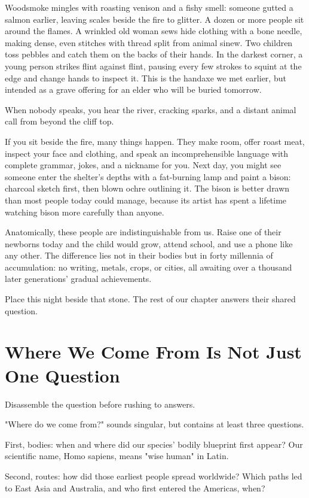 Woodsmoke mingles with roasting venison and a fishy smell: someone gutted a salmon earlier, leaving scales beside the fire to glitter. A dozen or more people sit around the flames. A wrinkled old woman sews hide clothing with a bone needle, making dense, even stitches with thread split from animal sinew. Two children toss pebbles and catch them on the backs of their hands. In the darkest corner, a young person strikes flint against flint, pausing every few strokes to squint at the edge and change hands to inspect it. This is the handaxe we met earlier, but intended as a grave offering for an elder who will be buried tomorrow.

When nobody speaks, you hear the river, cracking sparks, and a distant animal call from beyond the cliff top.

If you sit beside the fire, many things happen. They make room, offer roast meat, inspect your face and clothing, and speak an incomprehensible language with complete grammar, jokes, and a nickname for you. Next day, you might see someone enter the shelter's depths with a fat-burning lamp and paint a bison: charcoal sketch first, then blown ochre outlining it. The bison is better drawn than most people today could manage, because its artist has spent a lifetime watching bison more carefully than anyone.

Anatomically, these people are indistinguishable from us. Raise one of their newborns today and the child would grow, attend school, and use a phone like any other. The difference lies not in their bodies but in forty millennia of accumulation: no writing, metals, crops, or cities, all awaiting over a thousand later generations' gradual achievements.

Place this night beside that stone. The rest of our chapter answers their shared question.

\section[Where We Come From: Several Questions]{Where We Come From Is Not Just One Question}
Disassemble the question before rushing to answers.

"Where do we come from?" sounds singular, but contains at least three questions.

First, bodies: when and where did our species' bodily blueprint first appear? Our scientific name, Homo sapiens, means "wise human" in Latin.

Second, routes: how did those earliest people spread worldwide? Which paths led to East Asia and Australia, and who first entered the Americas, when?

